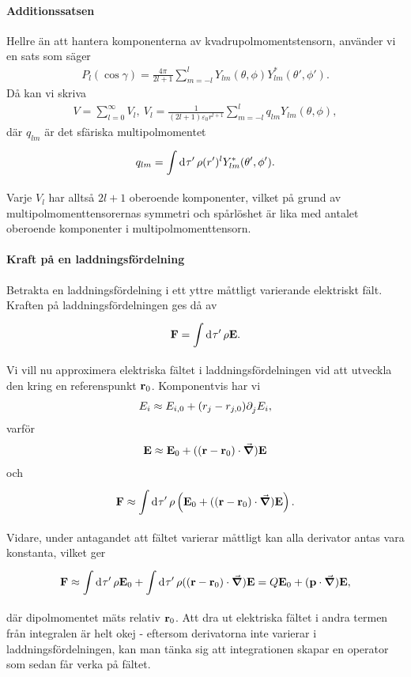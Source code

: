 \paragraph{Additionssatsen}
Hellre än att hantera komponenterna av kvadrupolmomentstensorn, använder vi en sats som säger
\begin{align*}
	P_{l}(\cos{\gamma}) = \frac{4\pi}{2l + 1}\sum\limits_{m = -l}^{l}Y_{lm}(\theta, \phi)Y_{lm}^{*}(\theta', \phi').
\end{align*}
Då kan vi skriva
\begin{align*}
	V = \sum\limits_{l = 0}^{\infty}V_{l},\ V_{l} = \frac{1}{(2l + 1)\varepsilon_{0}r^{l + 1}}\sum\limits_{m = -l}^{l}q_{lm}Y_{lm}(\theta, \phi),
\end{align*}
där $q_{lm}$ är det sfäriska multipolmomentet
\begin{align*}
	q_{lm} = \int\limits_{}^{}\dd[]{\tau'}\rho (r')^{l}Y_{lm}^{*}(\theta', \phi').
\end{align*}
Varje $V_{l}$ har alltså $2l + 1$ oberoende komponenter, vilket på grund av multipolmomenttensorernas symmetri och spårlöshet är lika med antalet oberoende komponenter i multipolmomenttensorn.

\paragraph{Kraft på en laddningsfördelning}
Betrakta en laddningsfördelning i ett yttre måttligt varierande elektriskt fält. Kraften på laddningsfördelningen ges då av
\begin{align*}
	\vb{F} = \int\limits_{}^{}\dd[]{\tau'}\rho\vb{E}.
\end{align*}
Vi vill nu approximera elektriska fältet i laddningsfördelningen vid att utveckla den kring en referenspunkt $\vb{r}_{0}$. Komponentvis har vi
\begin{align*}
	E_{i} \approx E_{i, 0} + (r_{j} - r_{j, 0})\partial_{j}^{}E_{i},
\end{align*}
varför
\begin{align*}
	\vb{E} \approx \vb{E}_{0} + ((\vb{r} - \vb{r}_{0})\cdot\grad)\vb{E}
\end{align*}
och
\begin{align*}
	\vb{F} \approx \int\limits_{}^{}\dd[]{\tau'}\rho\left(\vb{E}_{0} + ((\vb{r} - \vb{r}_{0})\cdot\grad)\vb{E}\right).
\end{align*}
Vidare, under antagandet att fältet varierar måttligt kan alla derivator antas vara konstanta, vilket ger
\begin{align*}
	\vb{F} \approx \int\limits_{}^{}\dd[]{\tau'}\rho\vb{E}_{0} + \int\limits_{}^{}\dd[]{\tau'}\rho((\vb{r} - \vb{r}_{0})\cdot\grad)\vb{E} = Q\vb{E}_{0} + (\vb{p}\cdot\grad)\vb{E},
\end{align*}
där dipolmomentet mäts relativ $\vb{r}_{0}$. Att dra ut elektriska fältet i andra termen från integralen är helt okej - eftersom derivatorna inte varierar i laddningsfördelningen, kan man tänka sig att integrationen skapar en operator som sedan får verka på fältet.


